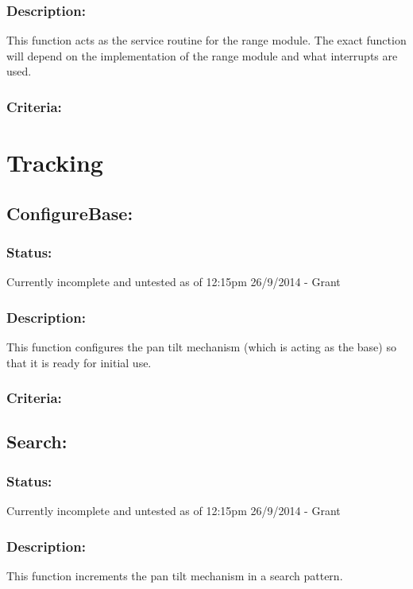 \documentclass[]{article}
\begin{document}
\subsubsection{Description:}
This function acts as the service routine for the range module. The exact function will depend on the implementation of the range module and what interrupts are used.

\subsubsection{Criteria:}

\newpage
\section{Tracking}

\subsection{ConfigureBase:}
\subsubsection{Status:}
Currently incomplete and untested as of 12:15pm 26/9/2014 - Grant

\subsubsection{Description:}
This function configures the pan tilt mechanism (which is acting as the base) so that it is ready for initial use.

\subsubsection{Criteria:}

\subsection{Search:}
\subsubsection{Status:}
Currently incomplete and untested as of 12:15pm 26/9/2014 - Grant

\subsubsection{Description:}
This function increments the pan tilt mechanism in a search pattern.
\end{document}
